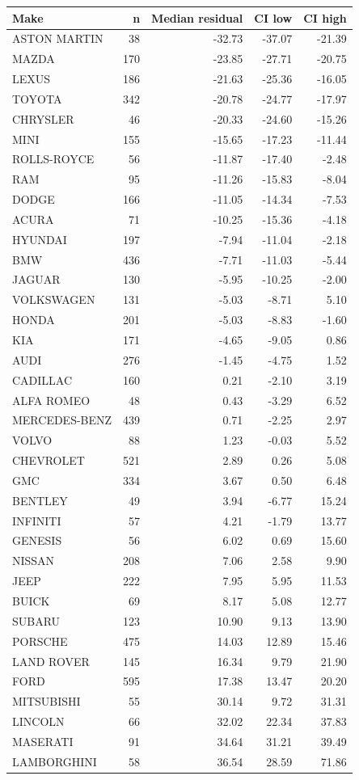 \begin{tabular}{lrrrr}
\toprule
Make & n & Median residual & CI low & CI high \\
\midrule
ASTON MARTIN & 38 & -32.73 & -37.07 & -21.39 \\
MAZDA & 170 & -23.85 & -27.71 & -20.75 \\
LEXUS & 186 & -21.63 & -25.36 & -16.05 \\
TOYOTA & 342 & -20.78 & -24.77 & -17.97 \\
CHRYSLER & 46 & -20.33 & -24.60 & -15.26 \\
MINI & 155 & -15.65 & -17.23 & -11.44 \\
ROLLS-ROYCE & 56 & -11.87 & -17.40 & -2.48 \\
RAM & 95 & -11.26 & -15.83 & -8.04 \\
DODGE & 166 & -11.05 & -14.34 & -7.53 \\
ACURA & 71 & -10.25 & -15.36 & -4.18 \\
HYUNDAI & 197 & -7.94 & -11.04 & -2.18 \\
BMW & 436 & -7.71 & -11.03 & -5.44 \\
JAGUAR & 130 & -5.95 & -10.25 & -2.00 \\
VOLKSWAGEN & 131 & -5.03 & -8.71 & 5.10 \\
HONDA & 201 & -5.03 & -8.83 & -1.60 \\
KIA & 171 & -4.65 & -9.05 & 0.86 \\
AUDI & 276 & -1.45 & -4.75 & 1.52 \\
CADILLAC & 160 & 0.21 & -2.10 & 3.19 \\
ALFA ROMEO & 48 & 0.43 & -3.29 & 6.52 \\
MERCEDES-BENZ & 439 & 0.71 & -2.25 & 2.97 \\
VOLVO & 88 & 1.23 & -0.03 & 5.52 \\
CHEVROLET & 521 & 2.89 & 0.26 & 5.08 \\
GMC & 334 & 3.67 & 0.50 & 6.48 \\
BENTLEY & 49 & 3.94 & -6.77 & 15.24 \\
INFINITI & 57 & 4.21 & -1.79 & 13.77 \\
GENESIS & 56 & 6.02 & 0.69 & 15.60 \\
NISSAN & 208 & 7.06 & 2.58 & 9.90 \\
JEEP & 222 & 7.95 & 5.95 & 11.53 \\
BUICK & 69 & 8.17 & 5.08 & 12.77 \\
SUBARU & 123 & 10.90 & 9.13 & 13.90 \\
PORSCHE & 475 & 14.03 & 12.89 & 15.46 \\
LAND ROVER & 145 & 16.34 & 9.79 & 21.90 \\
FORD & 595 & 17.38 & 13.47 & 20.20 \\
MITSUBISHI & 55 & 30.14 & 9.72 & 31.31 \\
LINCOLN & 66 & 32.02 & 22.34 & 37.83 \\
MASERATI & 91 & 34.64 & 31.21 & 39.49 \\
LAMBORGHINI & 58 & 36.54 & 28.59 & 71.86 \\
\bottomrule
\end{tabular}
